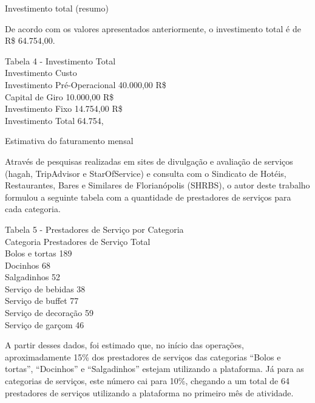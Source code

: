 Investimento total (resumo)\par
De acordo com os valores apresentados anteriormente, o investimento total é
de R\$ 64.754,00. \par

\begin{commentB}
	Tabela 4 - Investimento Total \\
	Investimento Custo \\
	Investimento Pré-Operacional 40.000,00 R\$ \\
	Capital de Giro 10.000,00 R\$ \\
	Investimento Fixo 14.754,00 R\$ \\
	Investimento Total 64.754,
	\par \end{commentB}


Estimativa do faturamento mensal \par
Através de pesquisas realizadas em sites de divulgação e avaliação de serviços 
(hagah, TripAdvisor e StarOfService) e consulta com o Sindicato de Hotéis, 
Restaurantes, Bares e Similares de Florianópolis (SHRBS), o autor deste trabalho 
formulou a seguinte tabela com a quantidade de prestadores de serviços para cada 
categoria. \par

\begin{commentB}
	Tabela 5 - Prestadores de Serviço por Categoria \\
	Categoria Prestadores de 
	Serviço Total \\
	Bolos e tortas 189 \\
	Docinhos 68 \\
	Salgadinhos 52 \\
	Serviço de bebidas 38 \\
	Serviço de buffet 77 \\
	Serviço de decoração 59 \\
	Serviço de garçom 46
	
	\par \end{commentB}



A partir desses dados, foi estimado que, no início das operações, 
aproximadamente 15\% dos prestadores de serviços das categorias “Bolos e tortas”, 
“Docinhos” e “Salgadinhos” estejam utilizando a plataforma. Já para as categorias de 
serviços, este número cai para 10\%, chegando a um total de 64 prestadores de serviços utilizando a plataforma no primeiro mês de atividade.\par


